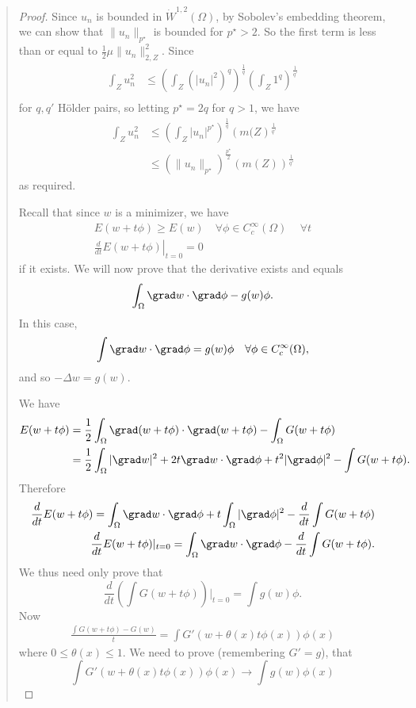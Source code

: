 \documentclass[10pt, oneside, reqno]{amsart}
\theoremstyle{plain}%
\numberwithin{equation}{section}
\theoremstyle{definition}
\theoremstyle{remark}
\begin{document}
\begin{quote}
\begin{proof}
     Since $u_n$ is bounded in $\dot W^{1, 2}(\Omega)$, by Sobolev's embedding theorem, we can show that $\| u_n \|_{p^\star}$ is bounded for $p^\star > 2$.  So the first term is less than or equal to $\frac{1}{2}\mu \| u_n \|_{2, Z}^2$.  Since \begin{align*}
        \int_Z u_n^2 &\leq \left( \int_Z \left(|u_n|^2\right)^{q} \right)^\frac{1}{q} \left( \int_Z 1^q \right)^\frac{1}{q'} \\
    \end{align*}  for $q, q'$ H\"older pairs, so letting $p^\star = 2q$ for $q > 1$, we have \begin{align*}
        \int_Z u_n^2 &\leq \left( \int_Z |u_n|^{p^\star}\right)^{\frac{1}{q}} \left(m(Z \right)^{\frac{1}{q'}} \\
        &\leq  \left( \| u_n \|_{p^\star} \right)^{\frac{p^\star}{2}} \left( m(Z) \right)^{\frac{1}{q'}}
    \end{align*} as required.
    
    Recall that since $w$ is a minimizer, we have \begin{align*}
        E(w + t \phi) \geq E(w) \quad \forall \phi \in C^\infty_c(\Omega)\, \quad \forall t \\
        \left.\frac{d}{dt} E(w + t \phi) \right|_{t = 0} = 0
    \end{align*}  if it exists.  We will now prove that the derivative exists and equals \[
        \int_\Omega \grad w \cdot \grad \phi - g(w) \phi. 
    \]  In this case, \[
        \int \grad w \cdot \grad \phi = g(w) \phi \quad \forall \phi \in C^\infty_c(\Omega),
    \] and so $-\Delta w = g(w)$.

    We have \begin{align*}
        E(w + t \phi) &= \frac{1}{2} \int_\Omega \grad(w + t \phi) \cdot \grad (w + t \phi) - \int_\Omega G(w + t \phi) \\
        &= \frac{1}{2} \int_\Omega |\grad w|^2 + 2t\grad w \cdot \grad \phi + t^2 |\grad \phi |^2 - \int G(w + t \phi).
    \end{align*} Therefore \begin{align*}
        \frac{d}{dt} E(w + t \phi) = \int_\Omega \grad w \cdot \grad \phi + t \int_\Omega |\grad \phi|^2 - \frac{d}{dt} \int G(w + t \phi) \\
        \frac{d}{dt} E(w + t\phi) |_{t = 0} = \int_\Omega \grad w \cdot \grad \phi - \frac{d}{dt} \int G(w + t \phi). 
    \end{align*}  We thus need only prove that \[
        \frac{d}{dt}(\int G(w + t\phi))|_{t = 0} = \int g(w) \phi.
    \]  Now \begin{align*}
        \frac{  \int G(w + t \phi) - G(w)}{t} = \int G'(w + \theta(x) t \phi(x)) \phi(x)
    \end{align*} where $0 \leq \theta(x) \leq 1$.  We need to prove (remembering $G' = g$), that \[
        \int G'(w + \theta(x) t \phi(x)) \phi(x) \rightarrow \int g(w) \phi(x)
    \]
    

\end{proof}
\end{quote}
\end{document}

